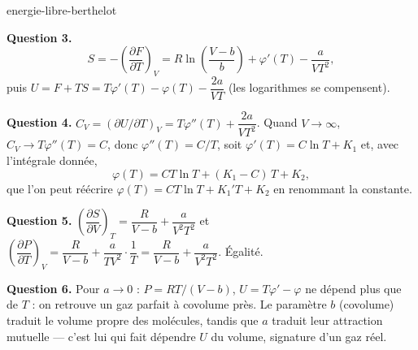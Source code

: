 \begin{exo}{energie-libre-berthelot}
\begin{solution}
\textbf{Question 3.}
\[
S = -\left(\frac{\partial F}{\partial T}\right)_V = R\ln\!\left(\frac{V-b}{b}\right) + \varphi'(T) - \frac{a}{VT^2},
\]
puis $U = F + TS = T\varphi'(T) - \varphi(T) - \dfrac{2a}{VT}$ (les logarithmes se compensent).

\textbf{Question 4.} $C_V = \left(\partial U/\partial T\right)_V = T\varphi''(T) + \dfrac{2a}{VT^2}$. Quand $V\to\infty$, $C_V \to T\varphi''(T) = C$, donc $\varphi''(T) = C/T$, soit $\varphi'(T) = C\ln T + K_1$ et, avec l'intégrale donnée,
\[
\varphi(T) = CT\ln T + (K_1 - C)\,T + K_2,
\]
que l'on peut réécrire $\varphi(T) = CT\ln T + K_1'T + K_2$ en renommant la constante.

\textbf{Question 5.} $\left(\dfrac{\partial S}{\partial V}\right)_T = \dfrac{R}{V-b} + \dfrac{a}{V^2T^2}$ et $\left(\dfrac{\partial P}{\partial T}\right)_V = \dfrac{R}{V-b} + \dfrac{a}{TV^2}\cdot\dfrac{1}{T} = \dfrac{R}{V-b} + \dfrac{a}{V^2T^2}$. Égalité. \checkmark

\textbf{Question 6.} Pour $a \to 0$ : $P = RT/(V-b)$, $U = T\varphi' - \varphi$ ne dépend plus que de $T$ : on retrouve un gaz parfait à covolume près. Le paramètre $b$ (covolume) traduit le volume propre des molécules, tandis que $a$ traduit leur attraction mutuelle — c'est lui qui fait dépendre $U$ du volume, signature d'un gaz réel.
\end{solution}
\end{exo}
